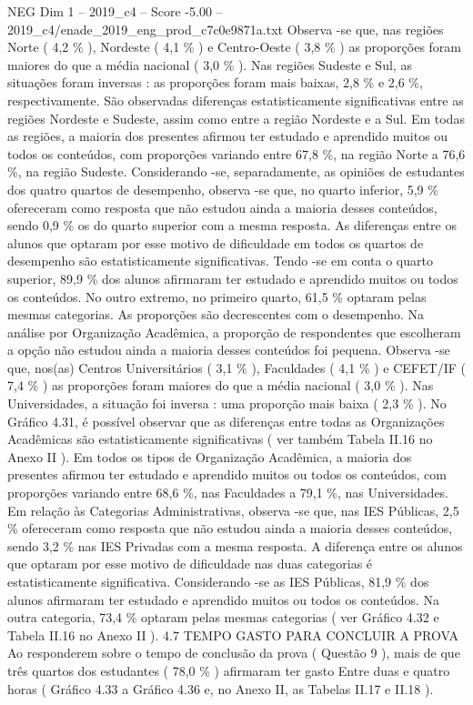 \begin{textsample}{NEG Dim 1 – 2019\_c4 – Score -5.00 – 2019\_c4/enade\_2019\_eng\_prod\_c7c0e9871a.txt}
Observa -se que, nas regiões Norte ( 4,2 \% ), Nordeste ( 4,1 \% ) e Centro-Oeste ( 3,8 \% ) as proporções foram maiores do que a média nacional ( 3,0 \% ).
Nas regiões Sudeste e Sul, as situações foram inversas : as proporções foram mais baixas, 2,8 \% e 2,6 \%, respectivamente.
São observadas diferenças estatisticamente significativas entre as regiões Nordeste e Sudeste, assim como entre a região Nordeste e a Sul.
Em todas as regiões, a maioria dos presentes afirmou ter estudado e aprendido muitos ou todos os conteúdos, com proporções variando entre 67,8 \%, na região Norte a 76,6 \%, na região Sudeste.
Considerando -se, separadamente, as opiniões de estudantes dos quatro quartos de desempenho, observa -se que, no quarto inferior, 5,9 \% ofereceram como resposta que não estudou ainda a maioria desses conteúdos, sendo 0,9 \% os do quarto superior com a mesma resposta.
As diferenças entre os alunos que optaram por esse motivo de dificuldade em todos os quartos de desempenho são estatisticamente significativas.
Tendo -se em conta o quarto superior, 89,9 \% dos alunos afirmaram ter estudado e aprendido muitos ou todos os conteúdos.
No outro extremo, no primeiro quarto, 61,5 \% optaram pelas mesmas categorias.
As proporções são decrescentes com o desempenho.
Na análise por Organização Acadêmica, a proporção de respondentes que escolheram a opção não estudou ainda a maioria desses conteúdos foi pequena.
Observa -se que, nos(as) Centros Universitários ( 3,1 \% ), Faculdades ( 4,1 \% ) e CEFET/IF ( 7,4 \% ) as proporções foram maiores do que a média nacional ( 3,0 \% ).
Nas Universidades, a situação foi inversa : uma proporção mais baixa ( 2,3 \% ).
No Gráfico 4.31, é possível observar que as diferenças entre todas as Organizações Acadêmicas são estatisticamente significativas ( ver também Tabela II.16 no Anexo II ).
Em todos os tipos de Organização Acadêmica, a maioria dos presentes afirmou ter estudado e aprendido muitos ou todos os conteúdos, com proporções variando entre 68,6 \%, nas Faculdades a 79,1 \%, nas Universidades.
Em relação às Categorias Administrativas, observa -se que, nas IES Públicas, 2,5 \% ofereceram como resposta que não estudou ainda a maioria desses conteúdos, sendo 3,2 \% nas IES Privadas com a mesma resposta.
A diferença entre os alunos que optaram por esse motivo de dificuldade nas duas categorias é estatisticamente significativa.
Considerando -se as IES Públicas, 81,9 \% dos alunos afirmaram ter estudado e aprendido muitos ou todos os conteúdos.
Na outra categoria, 73,4 \% optaram pelas mesmas categorias ( ver Gráfico 4.32 e Tabela II.16 no Anexo II ). 4.7 TEMPO GASTO PARA CONCLUIR A PROVA Ao responderem sobre o tempo de conclusão da prova ( Questão 9 ), mais de que três quartos dos estudantes ( 78,0 \% ) afirmaram ter gasto Entre duas e quatro horas ( Gráfico 4.33 a Gráfico 4.36 e, no Anexo II, as Tabelas II.17 e II.18 ).

\end{textsample}
